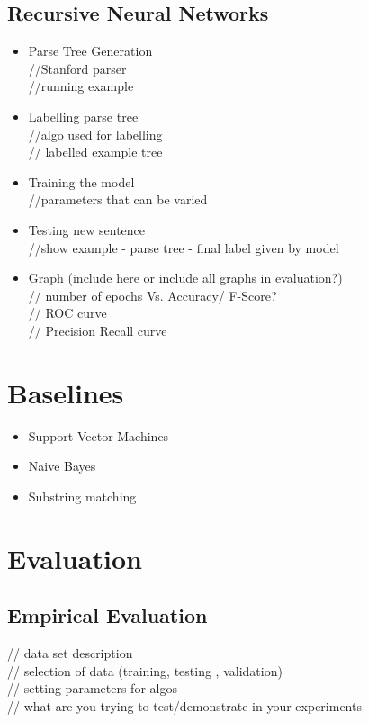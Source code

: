 \documentclass{article}
\begin{document}
\subsection*{Recursive Neural Networks}
\begin{itemize}
\item{Parse Tree Generation} \\
//Stanford parser \\
//running example
\item{Labelling parse tree} \\
//algo used for labelling \\
// labelled example tree
\item{Training the model} \\
//parameters that can be varied
\item{Testing new sentence} \\
//show example - parse tree - final label given by model
\item{Graph (include here or include all graphs in evaluation?)} \\
// number of epochs Vs. Accuracy/ F-Score? \\
// ROC curve \\
// Precision Recall curve
\end{itemize}

\section{Baselines}
\begin{itemize}
\item{Support Vector Machines}
\item{Naive Bayes}
\item{Substring matching}
\end{itemize}

\section{Evaluation}

\subsection*{Empirical Evaluation}
// data set description \\
// selection of data (training, testing , validation) \\
// setting parameters for algos \\
// what are you trying to test/demonstrate in your experiments
\end{document}
